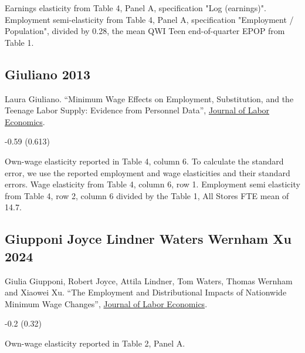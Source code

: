 \vspace{0.7em}

 Earnings elasticity from Table 4, Panel A, specification "Log (earnings)". Employment semi-elasticity from Table 4, Panel A, specification "Employment / Population", divided by 0.28, the mean QWI Teen end-of-quarter EPOP from Table 1.

\subsection*{Giuliano 2013}
\vspace{-0.7em}

\noindent Laura Giuliano. ``Minimum Wage Effects on Employment, Substitution, and the Teenage Labor Supply: Evidence from Personnel Data'', \href{https://doi.org/10.1086/666921}{Journal of Labor Economics}.

\vspace{0.7em}

 -0.59 (0.613)

\vspace{0.7em}

 Own-wage elasticity reported in Table 4, column 6. To calculate the standard error, we use the reported employment and wage elasticities and their standard errors. Wage elasticity from Table 4, column 6, row 1. Employment semi elasticity from Table 4, row 2, column 6 divided by the Table 1, All Stores FTE mean of 14.7.

\subsection*{Giupponi Joyce Lindner Waters Wernham Xu 2024}
\vspace{-0.7em}

\noindent Giulia Giupponi, Robert Joyce, Attila Lindner, Tom Waters, Thomas Wernham and Xiaowei Xu. ``The Employment and Distributional Impacts of Nationwide Minimum Wage Changes'', \href{https://doi.org/10.1086/728471}{Journal of Labor Economics}.

\vspace{0.7em}

 -0.2 (0.32)

\vspace{0.7em}

 Own-wage elasticity reported in Table 2, Panel A.

